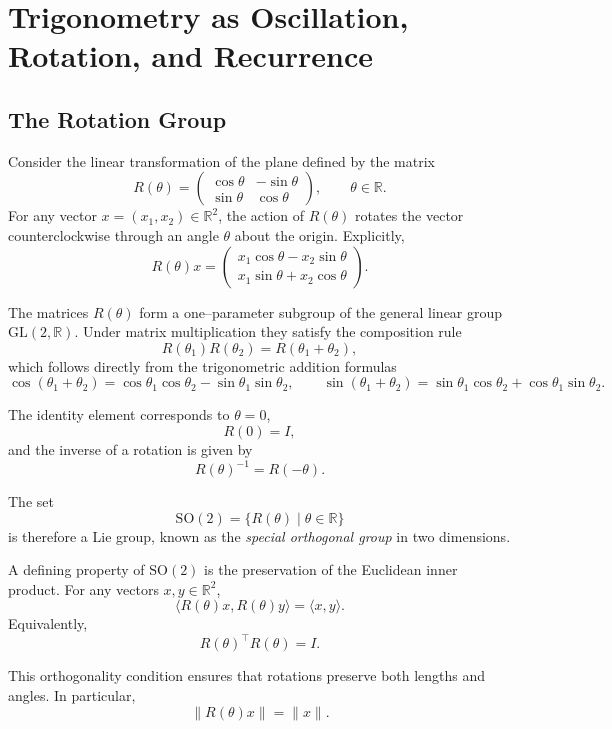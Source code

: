 \documentclass[11pt, openany]{book}
\theoremstyle{plain}
\theoremstyle{definition}
\theoremstyle{remark}
\begin{document}
\chapter{Trigonometry as Oscillation, Rotation, and Recurrence}

\section{The Rotation Group}

Consider the linear transformation of the plane defined by the matrix
\[
R(\theta)=
\begin{pmatrix}
\cos\theta & -\sin\theta \\
\sin\theta & \cos\theta
\end{pmatrix},
\qquad \theta\in\mathbb{R}.
\]
For any vector $x=(x_1,x_2)\in\mathbb{R}^2$, the action of $R(\theta)$
rotates the vector counterclockwise through an angle $\theta$ about the
origin. Explicitly,
\[
R(\theta)x=
\begin{pmatrix}
x_1\cos\theta-x_2\sin\theta \\
x_1\sin\theta+x_2\cos\theta
\end{pmatrix}.
\]

The matrices $R(\theta)$ form a one–parameter subgroup of the general
linear group $\mathrm{GL}(2,\mathbb{R})$.  Under matrix multiplication
they satisfy the composition rule
\[
R(\theta_1)R(\theta_2)=R(\theta_1+\theta_2),
\]
which follows directly from the trigonometric addition formulas
\[
\cos(\theta_1+\theta_2)
=\cos\theta_1\cos\theta_2-\sin\theta_1\sin\theta_2,
\qquad
\sin(\theta_1+\theta_2)
=\sin\theta_1\cos\theta_2+\cos\theta_1\sin\theta_2.
\]

The identity element corresponds to $\theta=0$,
\[
R(0)=I,
\]
and the inverse of a rotation is given by
\[
R(\theta)^{-1}=R(-\theta).
\]

The set
\[
\mathrm{SO}(2)
=
\{R(\theta)\mid\theta\in\mathbb{R}\}
\]
is therefore a Lie group, known as the \textit{special orthogonal group}
in two dimensions.

\medskip

A defining property of $\mathrm{SO}(2)$ is the preservation of the
Euclidean inner product.  For any vectors $x,y\in\mathbb{R}^2$,
\[
\langle R(\theta)x,R(\theta)y\rangle
=
\langle x,y\rangle .
\]
Equivalently,
\[
R(\theta)^\top R(\theta)=I.
\]

This orthogonality condition ensures that rotations preserve both
lengths and angles.  In particular,
\[
\|R(\theta)x\|=\|x\|.
\]
\end{document}
